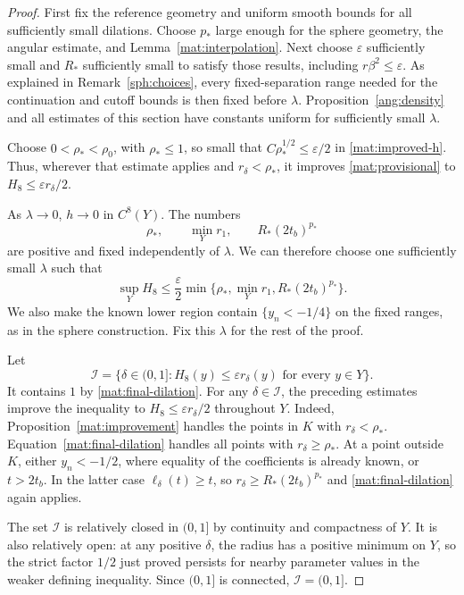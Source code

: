 \begin{proof}
First fix the reference geometry and uniform smooth bounds for all
sufficiently small dilations.  Choose $p_*$ large enough for the sphere
geometry, the angular estimate, and
Lemma~\ref{mat:interpolation}.  Next choose $\varepsilon$ sufficiently
small and $R_*$ sufficiently small to satisfy those results, including
$r\beta^2\le\varepsilon$.  As explained in
Remark~\ref{sph:choices}, every fixed-separation range needed for the
continuation and cutoff bounds is then fixed before $\lambda$.
Proposition~\ref{ang:density} and all estimates of this section have
constants uniform for sufficiently small $\lambda$.

Choose $0<\rho_*<\rho_0$, with $\rho_*\le1$, so small that
$C\rho_*^{1/2}\le\varepsilon/2$ in
\eqref{mat:improved-h}.  Thus, wherever that estimate applies and
$r_\delta<\rho_*$, it improves
\eqref{mat:provisional} to
$H_8\le\varepsilon r_\delta/2$.

As $\lambda\to0$, $h\to0$ in $C^8(Y)$.  The numbers
\[
 \rho_*,\qquad \min_Y r_1,\qquad R_*(2t_b)^{p_*}
\]
are positive and fixed independently of $\lambda$.  We can therefore
choose one sufficiently small $\lambda$ such that
\begin{equation}
 \sup_Y H_8\le\frac{\varepsilon}{2}
       \min\big\{\rho_*,\min_Yr_1,R_*(2t_b)^{p_*}\big\}.
 \label{mat:final-dilation}
\end{equation}
We also make the known lower region contain $\{y_n<-1/4\}$ on the
fixed ranges, as in the sphere construction.  Fix this $\lambda$ for
the rest of the proof.

Let
\[
 \mathcal I=\{\delta\in(0,1]:
              H_8(y)\le\varepsilon r_\delta(y)
                         \text{ for every }y\in Y\}.
\]
It contains $1$ by \eqref{mat:final-dilation}.  For any
$\delta\in\mathcal I$, the preceding estimates improve the inequality
to $H_8\le\varepsilon r_\delta/2$ throughout $Y$.  Indeed,
Proposition~\ref{mat:improvement} handles the points in $K$ with
$r_\delta<\rho_*$.  Equation~\eqref{mat:final-dilation} handles all
points with $r_\delta\ge\rho_*$.  At a point outside $K$, either
$y_n<-1/2$, where equality of the coefficients is already known, or
$t>2t_b$.  In the latter case
$\ell_\delta(t)\ge t$, so
$r_\delta\ge R_*(2t_b)^{p_*}$ and
\eqref{mat:final-dilation} again applies.

The set $\mathcal I$ is relatively closed in $(0,1]$ by continuity
and compactness of $Y$.  It is also relatively open: at any positive
$\delta$, the radius has a positive minimum on $Y$, so the strict
factor $1/2$ just proved persists for nearby parameter values in the
weaker defining inequality.  Since $(0,1]$ is connected,
$\mathcal I=(0,1]$.


\end{proof}
